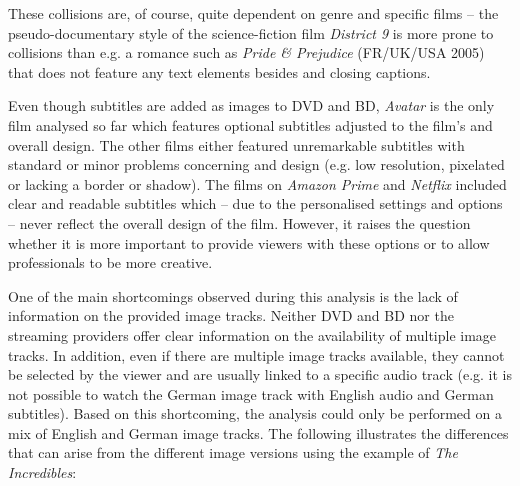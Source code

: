 These collisions are, of course, quite dependent on genre and specific films – the pseudo-documentary style of the science-fiction film \textit{District 9} is more prone to collisions than e.g. a romance such as \textit{Pride \& Prejudice} (FR/UK/USA 2005) that does not feature any text elements besides  and closing captions.

Even though subtitles are added as images to DVD and BD, \textit{Avatar} is the only film analysed so far which features optional subtitles adjusted to the film’s  and overall design. The other films either featured unremarkable subtitles with standard  or minor problems concerning  and design (e.g. low resolution, pixelated or lacking a border or shadow). The films on \textit{Amazon Prime} and \textit{Netflix} included clear and readable subtitles which – due to the personalised settings and options – never reflect the overall design of the film. However, it raises the question whether it is more important to provide viewers with these options or to allow professionals to be more creative.

One of the main shortcomings observed during this analysis is the lack of information on the provided image tracks. Neither DVD and BD nor the streaming providers offer clear information on the availability of multiple image tracks. In addition, even if there are multiple image tracks available, they cannot be selected by the viewer and are usually linked to a specific audio track (e.g. it is not possible to watch the German image track with English audio and German subtitles). Based on this shortcoming, the analysis could only be performed on a mix of English and German image tracks. The following  illustrates the differences that can arise from the different image versions using the example of \textit{The Incredibles}:

